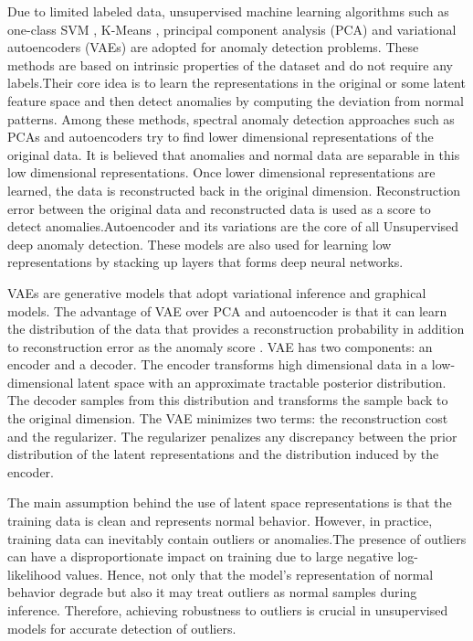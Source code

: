 \documentclass{article}
\theoremstyle{plain}
\theoremstyle{definition}
\begin{document}
Due to limited labeled data, unsupervised machine learning algorithms such as one-class SVM \cite{erfani2016high}, K-Means \cite{munz2007traffic}, principal component analysis (PCA) \cite{chandola2007outlier} and variational autoencoders (VAEs) \cite{an2015variational,yao2019unsupervised} are adopted for anomaly detection problems. These methods are based on intrinsic properties of the dataset and do not require any labels.Their core idea is to learn the representations in the original or some latent feature space and then detect anomalies by computing the deviation from normal patterns. Among these methods, spectral anomaly detection approaches such as PCAs and autoencoders try to find lower dimensional representations of the original data\cite{an2015variational}. It is believed that anomalies and normal data are separable in this low dimensional representations. Once lower dimensional representations are learned, the data is reconstructed back in the original dimension. Reconstruction error between the original data and reconstructed data is used as a score to detect anomalies.Autoencoder and its variations are the core of all Unsupervised deep anomaly detection. These models are also used for learning low representations by stacking up layers that forms deep neural networks.

VAEs \cite{kingma2013auto} are generative models that adopt variational inference and graphical models. The advantage of VAE over PCA and autoencoder is that it can learn the distribution of the data that provides a reconstruction probability in addition to reconstruction error as the anomaly score \cite{an2015variational}. VAE has two components: an encoder and a decoder. The encoder transforms high dimensional data in a low-dimensional latent space with an approximate tractable posterior distribution. The decoder samples from this distribution and transforms the sample back to the original dimension. The VAE minimizes two terms: the reconstruction cost and the regularizer. The regularizer penalizes any discrepancy between the prior distribution of the latent representations and the distribution induced by the encoder. 

The main assumption behind the use of latent space representations is that the training data is clean and represents normal behavior. However, in practice, training data can inevitably contain outliers or anomalies.The presence of outliers can have a disproportionate impact on training due to large negative log-likelihood values. Hence, not only that the model's representation of normal behavior degrade but also it may treat outliers as normal samples during inference. Therefore, achieving robustness to outliers is crucial in unsupervised models for accurate detection of outliers.
\end{document}
